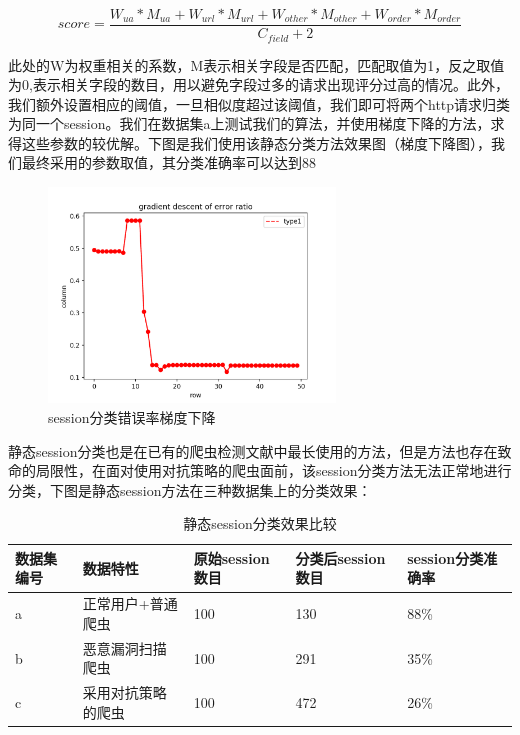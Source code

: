 \documentclass[doctor,privacy,twoside]{buaa_mac}
\begin{document}
$$score = \frac {W_{ua} * M_{ua} + W_{url} * M_{url} + W_{other} * M_{other} + W_{order} * M_{order}} {C_{field} + 2}$$

此处的W为权重相关的系数，M表示相关字段是否匹配，匹配取值为1，反之取值为0,表示相关字段的数目，用以避免字段过多的请求出现评分过高的情况。此外，我们额外设置相应的阈值，一旦相似度超过该阈值，我们即可将两个http请求归类为同一个session。我们在数据集a上测试我们的算法，并使用梯度下降的方法，求得这些参数的较优解。下图是我们使用该静态分类方法效果图（梯度下降图），我们最终采用的参数取值，其分类准确率可以达到88%

\centerline{}
\begin{figure}[!h]
  \centering
  \includegraphics[width=0.68\textwidth]{images/gradient_descent.png}
  \caption{session分类错误率梯度下降}
  \label{fig:logo}
\end{figure}
\centerline{}

静态session分类也是在已有的爬虫检测文献中最长使用的方法，但是方法也存在致命的局限性，在面对使用对抗策略的爬虫面前，该session分类方法无法正常地进行分类，下图是静态session方法在三种数据集上的分类效果：

\centerline{}
\begin{table}[h]
  \caption{静态session分类效果比较}
  \label{tab:papercomponents}
  \centering
\begin{tabular}{|p{2cm}<{\centering}||p{5cm}<{\centering}|p{2cm}<{\centering}|p{2cm}<{\centering}|p{2cm}<{\centering}|}
    \hline
    数据集编号 & 数据特性 & 原始session数目 & 分类后session数目 & session分类准确率    \\
    \hline
    a  &  正常用户+普通爬虫 & 100 & 130 & 88\% \\
    \hline
    b  &  恶意漏洞扫描爬虫 & 100 & 291 & 35\% \\
    \hline
     c  & 采用对抗策略的爬虫 & 100 & 472 & 26\% \\
    \hline
    \end{tabular}
\end{table}
\centerline{}
\end{document}
